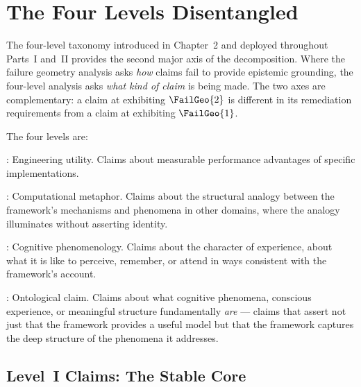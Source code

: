 
\chapter{The Four Levels Disentangled}
\label{ch:four-levels}


\noindent
The four-level taxonomy introduced in Chapter~2 and deployed
throughout Parts~I and~II provides the second major axis
of the decomposition. Where the failure geometry analysis
asks \textit{how} claims fail to provide epistemic grounding,
the four-level analysis asks \textit{what kind of claim}
is being made. The two axes are complementary: a claim
at \LevelIV{} exhibiting $\FailGeo{2}$ is different in
its remediation requirements from a claim at \LevelI{}
exhibiting $\FailGeo{1}$.

The four levels are:

\LevelI{}: Engineering utility. Claims about measurable
performance advantages of specific implementations.

\LevelII{}: Computational metaphor. Claims about the
structural analogy between the framework's mechanisms
and phenomena in other domains, where the analogy
illuminates without asserting identity.

\LevelIII{}: Cognitive phenomenology. Claims about
the character of experience, about what it is like
to perceive, remember, or attend in ways consistent
with the framework's account.

\LevelIV{}: Ontological claim. Claims about what
cognitive phenomena, conscious experience, or meaningful
structure fundamentally \textit{are} --- claims that
assert not just that the framework provides a useful
model but that the framework captures the deep structure
of the phenomena it addresses.

\section{Level~I Claims: The Stable Core}
\label{sec:level1-claims}

